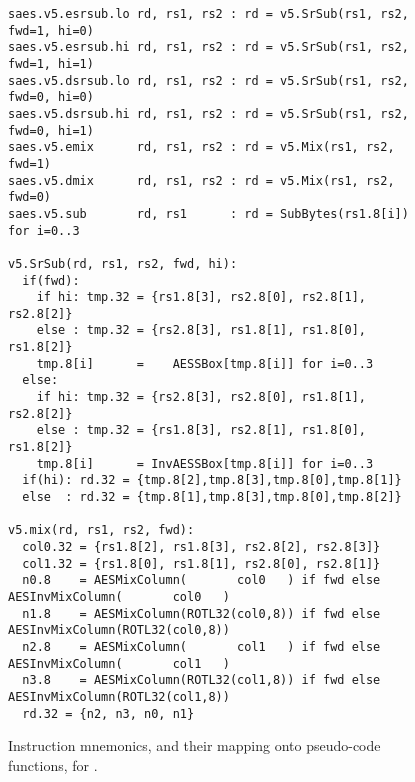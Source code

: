 \begin{figure}[p]
\begin{lstlisting}[language=pseudo,style=block]
saes.v5.esrsub.lo rd, rs1, rs2 : rd = v5.SrSub(rs1, rs2, fwd=1, hi=0)
saes.v5.esrsub.hi rd, rs1, rs2 : rd = v5.SrSub(rs1, rs2, fwd=1, hi=1)
saes.v5.dsrsub.lo rd, rs1, rs2 : rd = v5.SrSub(rs1, rs2, fwd=0, hi=0)
saes.v5.dsrsub.hi rd, rs1, rs2 : rd = v5.SrSub(rs1, rs2, fwd=0, hi=1)
saes.v5.emix      rd, rs1, rs2 : rd = v5.Mix(rs1, rs2, fwd=1)
saes.v5.dmix      rd, rs1, rs2 : rd = v5.Mix(rs1, rs2, fwd=0)
saes.v5.sub       rd, rs1      : rd = SubBytes(rs1.8[i])         for i=0..3

v5.SrSub(rd, rs1, rs2, fwd, hi):
  if(fwd):
    if hi: tmp.32 = {rs1.8[3], rs2.8[0], rs2.8[1], rs2.8[2]}
    else : tmp.32 = {rs2.8[3], rs1.8[1], rs1.8[0], rs1.8[2]}
    tmp.8[i]      =    AESSBox[tmp.8[i]] for i=0..3
  else:
    if hi: tmp.32 = {rs2.8[3], rs2.8[0], rs1.8[1], rs2.8[2]}
    else : tmp.32 = {rs1.8[3], rs2.8[1], rs1.8[0], rs1.8[2]}
    tmp.8[i]      = InvAESSBox[tmp.8[i]] for i=0..3
  if(hi): rd.32 = {tmp.8[2],tmp.8[3],tmp.8[0],tmp.8[1]}
  else  : rd.32 = {tmp.8[1],tmp.8[3],tmp.8[0],tmp.8[2]}

v5.mix(rd, rs1, rs2, fwd):
  col0.32 = {rs1.8[2], rs1.8[3], rs2.8[2], rs2.8[3]}
  col1.32 = {rs1.8[0], rs1.8[1], rs2.8[0], rs2.8[1]}
  n0.8    = AESMixColumn(       col0   ) if fwd else AESInvMixColumn(       col0   )
  n1.8    = AESMixColumn(ROTL32(col0,8)) if fwd else AESInvMixColumn(ROTL32(col0,8))
  n2.8    = AESMixColumn(       col1   ) if fwd else AESInvMixColumn(       col1   )
  n3.8    = AESMixColumn(ROTL32(col1,8)) if fwd else AESInvMixColumn(ROTL32(col1,8))
  rd.32 = {n2, n3, n0, n1}
\end{lstlisting}
\caption{
  Instruction mnemonics, and their mapping onto pseudo-code functions, for .
}
\label{fig:v5:pseudo}
\end{figure}

